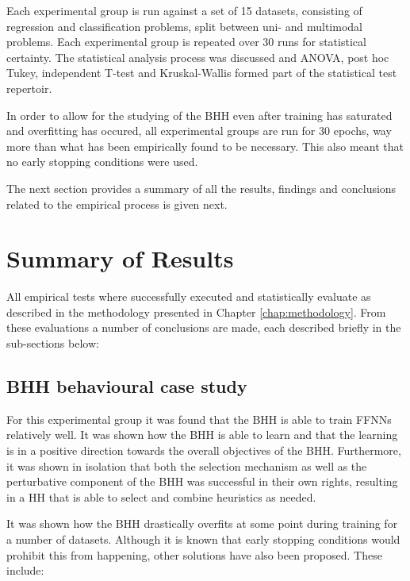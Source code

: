 Each experimental group is run against a set of 15 datasets, consisting of regression and classification problems, split between uni- and multimodal problems. Each experimental group is repeated over 30 runs for statistical certainty. The statistical analysis process was discussed and ANOVA, post hoc Tukey, independent T-test and Kruskal-Wallis formed part of the statistical test repertoir.

In order to allow for the studying of the \ac{BHH} even after training has saturated and overfitting has occured, all experimental groups are run for 30 epochs, way more than what has been empirically found to be necessary. This also meant that no early stopping conditions were used.

The next section provides a summary of all the results, findings and conclusions related to the empirical process is given next.

\section{Summary of Results}
\label{sec:conclusion:results}

All empirical tests where successfully executed and statistically evaluate as described in the methodology presented in Chapter \ref{chap:methodology}. From these evaluations a number of conclusions are made, each described briefly in the sub-sections below:

\subsection{\ac{BHH} behavioural case study}
\label{sec:conclusion:results:summary:case_study}

For this experimental group it was found that the \ac{BHH} is able to train \acp{FFNN} relatively well. It was shown how the \ac{BHH} is able to learn and that the learning is in a positive direction towards the overall objectives of the \ac{BHH}. Furthermore, it was shown in isolation that both the selection mechanism as well as the perturbative component of the \ac{BHH} was successful in their own rights, resulting in a \ac{HH} that is able to select and combine heuristics as needed.

It was shown how the \ac{BHH} drastically overfits at some point during training for a number of datasets. Although it is known that early stopping conditions would prohibit this from happening, other solutions have also been proposed. These include:

